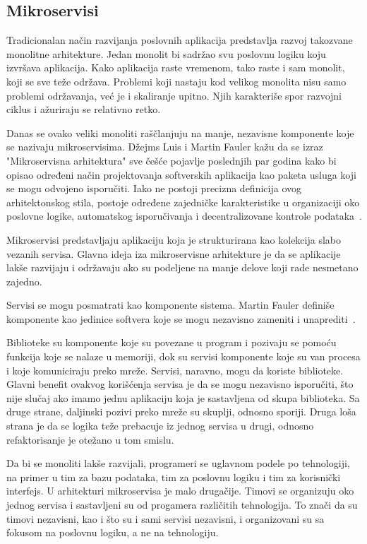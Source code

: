 \subsection{Mikroservisi}\label{sec:arhitektura-mikroservisi}

Tradicionalan način razvijanja poslovnih aplikacija predstavlja razvoj takozvane monolitne arhitekture. 
Jedan monolit bi sadržao svu poslovnu logiku koju izvršava aplikacija. Kako aplikacija raste vremenom, 
tako raste i sam monolit, koji se sve teže održava. Problemi koji nastaju kod velikog monolita nisu 
samo problemi održavanja, već je i skaliranje upitno. Njih karakteriše spor razvojni ciklus i ažuriraju se relativno retko.

Danas se ovako veliki monoliti raščlanjuju na manje, nezavisne komponente koje se nazivaju mikroservisima. 
Džejms Luis i Martin Fauler kažu da se izraz "Mikroservisna arhitektura" sve češće pojavlje poslednjih 
par godina kako bi opisao određeni način projektovanja softverskih aplikacija kao paketa usluga koji se 
mogu odvojeno isporučiti. Iako ne postoji precizna definicija ovog arhitektonskog stila, postoje određene 
zajedničke karakteristike u organizaciji oko poslovne logike, automatskog isporučivanja i decentralizovane 
kontrole podataka~\cite{martinfowler_microservices}.

Mikroservisi predstavljaju aplikaciju koja je strukturirana kao kolekcija slabo vezanih servisa. Glavna 
ideja iza mikroservisne arhitekture je da se aplikacije lakše razvijaju i održavaju ako su podeljene 
na manje delove koji rade nesmetano zajedno.

Servisi se mogu posmatrati kao komponente sistema. Martin Fauler definiše komponente kao jedinice 
softvera koje se mogu nezavisno zameniti i unaprediti~\cite{martinfowler_software_component}.

Biblioteke su komponente koje su povezane u program i pozivaju se pomoću funkcija koje se nalaze u 
memoriji, dok su servisi komponente koje su van procesa i koje komuniciraju preko mreže.
Servisi, naravno, mogu da koriste biblioteke. Glavni benefit ovakvog korišćenja servisa je da se mogu 
nezavisno isporučiti, što nije slučaj ako imamo jednu aplikaciju koja je sastavljena od skupa biblioteka.
Sa druge strane, daljinski pozivi preko mreže su skuplji, odnosno sporiji. 
Druga loša strana je da se logika teže prebacuje iz jednog servisa u drugi, odnosno refaktorisanje je 
otežano u tom smislu.

Da bi se monoliti lakše razvijali, programeri se uglavnom podele po tehnologiji, na primer u tim za 
bazu podataka, tim za poslovnu logiku i tim za korisnički interfejs. U arhitekturi mikroservisa je malo 
drugačije. Timovi se organizuju oko jednog servisa i sastavljeni su od progamera različitih tehnologija.
To znači da su timovi nezavisni, kao i što su i sami servisi nezavisni, i organizovani su sa fokusom na 
poslovnu logiku, a ne na tehnologiju.

